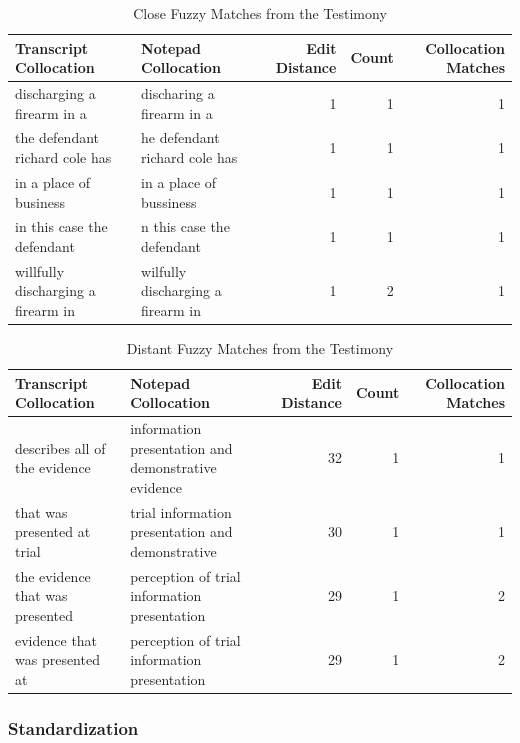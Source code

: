 \documentclass[print]{nuthesis}
\begin{document}
\newpage
\begin{landscape}

\begin{table}

\caption{\label{tab:fuzzyexam}Close Fuzzy Matches from the Testimony}
\centering
\begin{tabular}[t]{l|l|r|r|r}
\hline
Transcript Collocation & Notepad Collocation & Edit Distance & Count & Collocation Matches\\
\hline
discharging
a
firearm
in a & discharing
a
firearm
in a & 1 & 1 & 1\\
\hline
the
defendant
richard
cole
has & he
defendant
richard
cole
has & 1 & 1 & 1\\
\hline
in a
place
of
business & in a
place
of
bussiness & 1 & 1 & 1\\
\hline
in
this
case
the
defendant & n
this
case
the
defendant & 1 & 1 & 1\\
\hline
willfully
discharging
a
firearm
in & wilfully
discharging
a
firearm
in & 1 & 2 & 1\\
\hline
\end{tabular}
\end{table}

\begin{table}

\caption{\label{tab:fuzzyexamlarge}Distant Fuzzy Matches from the Testimony}
\centering
\begin{tabular}[t]{l|l|r|r|r}
\hline
Transcript Collocation & Notepad Collocation & Edit Distance & Count & Collocation Matches\\
\hline
describes
all
of
the
evidence & information
presentation
and
demonstrative
evidence & 32 & 1 & 1\\
\hline
that
was
presented
at
trial & trial
information
presentation
and
demonstrative & 30 & 1 & 1\\
\hline
the
evidence
that
was
presented & perception
of
trial
information
presentation & 29 & 1 & 2\\
\hline
evidence
that
was
presented
at & perception
of
trial
information
presentation & 29 & 1 & 2\\
\hline
\end{tabular}
\end{table}

\end{landscape}

\hypertarget{standardization-1}{%
\subsubsection{Standardization}\label{standardization-1}}
\end{document}
